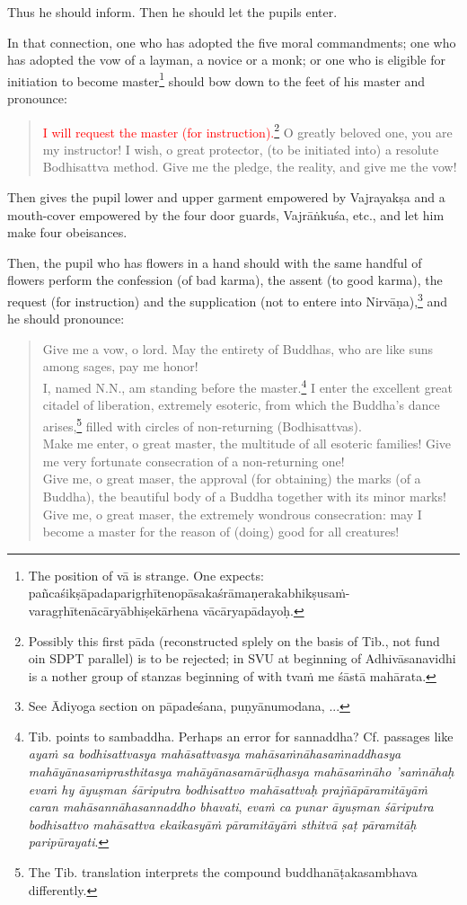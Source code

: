 \documentclass[11pt]{book}
\newcommand{\red}[1]{\textcolor{red}{#1}}
\begin{document}
Thus he should inform. Then he should let the pupils enter.

In that connection, one who has adopted the five moral commandments; one who has adopted the vow of a layman, a novice or a monk; or one who is eligible for initiation to become master\footnote{The position of vā is strange. One expects: pañcaśikṣāpadaparigṛhītenopāsakaśrāmaṇerakabhikṣusaṁ-
varagṛhītenācāryābhiṣekārhena vācāryapādayoḥ.} should bow down to the feet of his master and pronounce:

\begin{verse}
\red{I will request the master (for instruction).}\footnote{Possibly this first pāda (reconstructed splely on the basis of Tib., not fund oin SDPT parallel) is to be rejected; in SVU at beginning of Adhivāsanavidhi is a nother group of stanzas beginning of with tvaṁ me śāstā mahārata.} O greatly beloved one, you are my instructor! I wish, o great protector, (to be initiated into) a resolute Bodhisattva method. Give me the pledge, the reality, and give me the vow!
\end{verse}

Then gives the pupil lower and upper garment empowered by Vajrayakṣa and a mouth-cover empowered by the four door guards, Vajrāṅkuśa, etc., and let him make four obeisances.

Then, the pupil who has flowers in a hand should with the same handful of flowers perform the confession (of bad karma), the assent (to good karma), the request (for instruction) and the supplication (not to entere into Nirvāṇa),\footnote{See Ādiyoga section on pāpadeśana, puṇyānumodana, ...} and he should pronounce:

\begin{verse}
Give me a vow, o lord. May the entirety of Buddhas, who are like suns among sages, pay me honor! \\
I, named N.N., am standing before the master.\footnote{Tib. points to sambaddha. Perhaps an error for sannaddha? Cf. passages like \emph{ayaṁ sa bodhisattvasya mahāsattvasya mahāsaṁnāhasaṁnaddhasya mahāyānasaṁprasthitasya mahāyānasamārūḍhasya mahāsaṁnāho 'saṁnāhaḥ evaṁ hy āyuṣman śāriputra bodhisattvo mahāsattvaḥ prajñāpāramitāyāṁ caran mahāsannāhasannaddho bhavati}, \emph{evaṁ ca punar āyuṣman śāriputra bodhisattvo mahāsattva ekaikasyāṁ pāramitāyāṁ sthitvā ṣaṭ pāramitāḥ paripūrayati}.} I enter the excellent great citadel of liberation, extremely esoteric, from which the Buddha's dance arises,\footnote{The Tib. translation interprets the compound buddhanāṭakasambhava differently.} filled with circles of non-returning (Bodhisattvas).\\
Make me enter, o great master, the multitude of all esoteric families! Give me very fortunate consecration of a non-returning one!\\
Give me, o great maser, the approval (for obtaining) the marks (of a Buddha), the beautiful body of a Buddha together with its minor marks!\\
Give me, o great maser, the extremely wondrous consecration: may I become a master for the reason of (doing) good for all creatures!
\end{verse}
\end{document}
